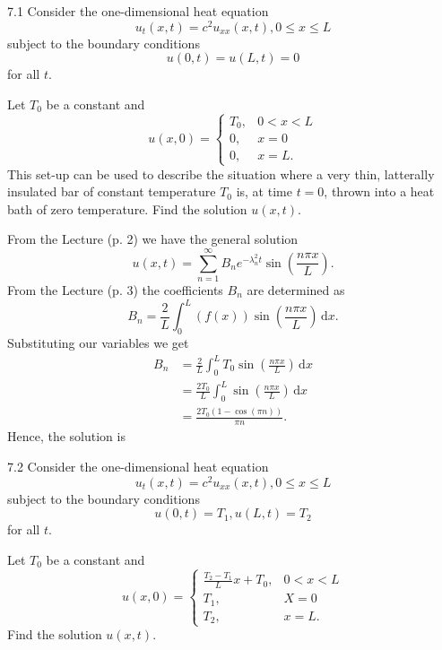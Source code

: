 
\begin{problem}{7.1}
  Consider the one-dimensional heat equation
  \[ 
  u_t(x,t) = c^2 u_{x x}(x, t), 0 \leq x \leq L
  \]
  subject to the boundary conditions
  \[ 
  u(0,t) = u(L,t) = 0
  \]
  for all $t$.
  
  Let $T_0$ be a constant and
  \[ 
  u(x,0) = \begin{cases}
  T_0, & 0 < x < L\\
  0, & x = 0 \\
  0, & x = L
  .\end{cases}
  \]
  This set-up can be used to describe the situation where a very thin, latterally insulated bar of constant temperature $T_0$ is, at time $t = 0$, thrown into a heat bath of zero temperature.
  Find the solution $u(x,t)$.
\end{problem}

\begin{derivation}
  From the Lecture (p. 2) we have the general solution
  \begin{equation*}
    u(x,t) = \sum_{n = 1}^{\infty} B_n e^{- \lambda_n^2t} \sin \left( \frac{n \pi x}{L} \right)
  .\end{equation*}
  From the Lecture (p. 3) the coefficients $B_n$ are determined as
  \begin{equation*}
    B_n = \frac{2}{L} \int_{0}^{L} \left( f(x) \right) \sin \left( \frac{n \pi x}{L} \right) \, \mathrm{d}x 
  .\end{equation*}
  Substituting our variables we get
  \begin{align*}
    B_n &= \frac{2}{L} \int_{0}^{L} T_0 \sin \left( \frac{n \pi x}{L} \right) \, \mathrm{d}x  \\
    &= \frac{2 T_0}{L} \int_{0}^{L} \sin \left( \frac{n \pi x}{L} \right)\, \mathrm{d}x  \\
    &=  \frac{2T_0 (1- \cos (\pi  n))}{\pi  n}
  .\end{align*}
  Hence, the solution is  
\end{derivation}


\begin{problem}{7.2}
  Consider the one-dimensional heat equation
  \[ 
  u_t(x,t) = c^2 u_{x x} (x,t), 0 \leq x \leq L
  \]
  subject to the boundary conditions
  \[ 
  u(0,t) = T_1, u(L,t) = T_2
  \]
  for all $t$.

  Let $T_0$ be a constant and
  \[ 
  u(x,0) = \begin{cases}
  \frac{T_2 - T_1}{L}x + T_0, & 0 < x < L\\
  T_1, & X = 0 \\
  T_2, & x = L
  .\end{cases}
  \]
  Find the solution $u(x,t)$.
\end{problem}

